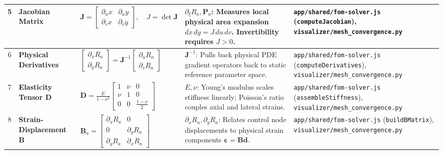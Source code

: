 \begin{landscape}
\begin{center}
\begin{longtable}{|c|p{3.5cm}|p{6cm}|p{6cm}|p{6cm}|}
5 & \textbf{Jacobian Matrix} & $\mathbf{J} = \begin{bmatrix} \partial_u x & \partial_u y \\ \partial_v x & \partial_v y \end{bmatrix}, \quad J = \det \mathbf{J}$ & $\partial_{\xi} R_a, \mathbf{P}_a$: Measures local physical area expansion $dx\,dy = J\,du\,dv$. Invertibility requires $J > 0$. & \texttt{app/shared/fom-solver.js} (\texttt{computeJacobian}), \texttt{visualizer/mesh\_convergence.py} \\
\hline

6 & \textbf{Physical Derivatives} & $\begin{bmatrix} \partial_x R_a \\ \partial_y R_a \end{bmatrix} = \mathbf{J}^{-1} \begin{bmatrix} \partial_u R_a \\ \partial_v R_a \end{bmatrix}$ & $\mathbf{J}^{-1}$: Pulls back physical PDE gradient operators back to static reference parameter space. & \texttt{app/shared/fom-solver.js} (\texttt{computeDerivatives}), \texttt{visualizer/mesh\_convergence.py} \\
\hline

7 & \textbf{Elasticity Tensor $\mathbf{D}$} & $\mathbf{D} = \frac{E}{1-\nu^2}\begin{bmatrix} 1 & \nu & 0 \\ \nu & 1 & 0 \\ 0 & 0 & \frac{1-\nu}{2} \end{bmatrix}$ & $E, \nu$: Young's modulus scales stiffness linearly; Poisson's ratio couples axial and lateral strains. & \texttt{app/shared/fom-solver.js} (\texttt{assembleStiffness}), \texttt{visualizer/mesh\_convergence.py} \\
\hline

8 & \textbf{Strain-Displacement $\mathbf{B}$} & $\mathbf{B}_a = \begin{bmatrix} \partial_x R_a & 0 \\ 0 & \partial_y R_a \\ \partial_y R_a & \partial_x R_a \end{bmatrix}$ & $\partial_x R_a, \partial_y R_a$: Relates control node displacements to physical strain components $\boldsymbol{\varepsilon} = \mathbf{B} \mathbf{d}$. & \texttt{app/shared/fom-solver.js} (\texttt{buildBMatrix}), \texttt{visualizer/mesh\_convergence.py} \\
\hline


\end{longtable}
\end{center}
\end{landscape}
